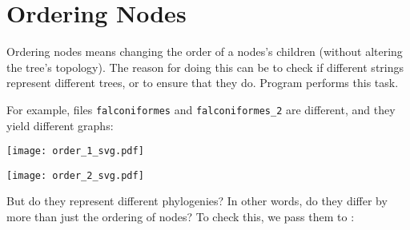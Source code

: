 \section{Ordering Nodes}
\label{sct_ordering}

Ordering nodes means changing the order of a nodes's children (without altering
the tree's topology). The reason for doing this can be to check if 
different \nw{} strings represent different trees, or to ensure that
they do. Program \order{} performs this task.

For example, files \texttt{falconiformes} and \texttt{falconiformes\_2} are
different, and they yield different graphs:


\begin{center}
\texttt{[image: order\_1\_svg.pdf]}
\end{center}


\begin{center}
\texttt{[image: order\_2\_svg.pdf]}
\end{center}

\noindent{}But do they represent different phylogenies? In other words, do they
differ by more than just the ordering of nodes? To check this, we pass them to \order:


